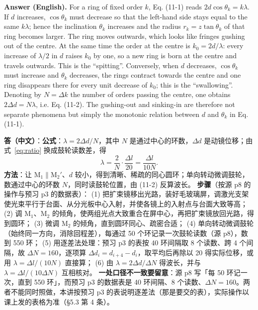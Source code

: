 \documentclass[11pt]{ctexart}
\newcommand{\Dl}{d}
\newcommand{\qaneed}[1]{\needspace{#1\textheight}}
\begin{document}
\textbf{Answer (English).} For a ring of fixed order $k$, Eq. (11-1) reads $2\Dl\cos\theta_k=k\lambda$. If $\Dl$ increases, $\cos\theta_k$ must decrease so that the left-hand side stays equal to the same $k\lambda$; hence the inclination $\theta_k$ increases and the radius $r_k=z\tan\theta_k$ of that ring becomes larger. The ring moves outwards, which looks like fringes gushing out of the centre. At the same time the order at the centre is $k_0=2\Dl/\lambda$: every increase of $\lambda/2$ in $\Dl$ raises $k_0$ by one, so a new ring is born at the centre and travels outwards. This is the ``spitting''. Conversely, when $\Dl$ decreases, $\cos\theta_k$ must increase and $\theta_k$ decreases, the rings contract towards the centre and one ring disappears there for every unit decrease of $k_0$; this is the ``swallowing''. Denoting by $N=\Delta k$ the number of orders passing the centre, one obtains $2\Delta\Dl=N\lambda$, i.e. Eq. (11-2). The gushing-out and sinking-in are therefore not separate phenomena but simply the monotonic relation between $\Dl$ and $\theta_k$ in Eq. (11-1).

\qaneed{0.86}


\textbf{答（中文）}：\textbf{公式}：$\lambda=2\Delta\Dl/N$，其中 $N$ 是通过中心的环数，$\Delta\Dl$ 是动镜位移；由式~\eqref{eq:ratio} 换成鼓轮读数差，得
\[
  \lambda=\frac{2}{N}\cdot\frac{\Delta l}{20}=\frac{\Delta l}{10N}.
\]
\textbf{方法}：让 M$_1\parallel$M$_2'$、$\Dl$ 较小，得到清晰、稀疏的同心圆环；单向转动微调鼓轮，数通过中心的环数 $N$，同时读鼓轮位置，由 (11-2) 反算波长。
\textbf{步骤}（按源 p8 的操作与预习 p3 的数据表）：
(1) 把扩束镜移出光路，装好毛玻璃屏，调激光支架使光束平行于台面、从分光板中心入射，并使各镜上的入射点与台面大致等高；
(2) 调 M$_1$、M$_2$ 的倾角，使两组光点大致重合在屏中心，再把扩束镜放回光路，得到圆环；
(3) 微调 M$_2$ 的倾角，直到圆环同心、疏密合适；
(4) 单向转动微调鼓轮（始终同一方向，消除回程差），每通过 50 个环记录一次鼓轮读数（源 p8），数到 550 环；
(5) 用逐差法处理：预习 p3 的表按 40 环间隔取 8 个读数、跨 4 个间隔，故 $\Delta N=160$，逐项算 $\Delta\Dl_i=\Dl_{i+4}-\Dl_i$，取平均后再除以 20 得实际位移，或用 $\lambda=\Delta l/(10N)$ 直接算；
(6) 由 $\lambda=2\Delta\Dl/\Delta N$ 得波长，并与 $\lambda=\Delta l/(10\Delta N)$ 互相核对。
\textbf{一处口径不一致要留意}：源 p8 写「每 50 环记一次，直到 550 环」，而预习 p3 的数据表是 40 环间隔、8 个读数、$\Delta N=160$。两者不能同时照做，本讲按预习 p3 的表说明逐差法（那是要交的表），实际操作以课上发的表格为准（§5.3 第 4 条）。
\end{document}
